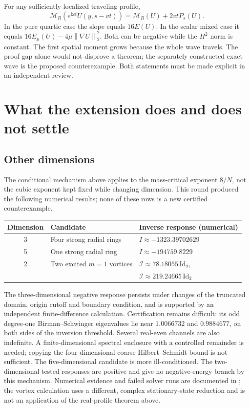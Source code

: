 \documentclass[11pt,a4paper]{article}
\theoremstyle{remark}\newtheorem{remark}[theorem]{Remark}
\newcommand{\ii}{\mathrm i}\newcommand{\dd}{\,\mathrm d}
\newcommand{\norm}[1]{\left\|#1\right\|}
\begin{document}
For any sufficiently localized traveling profile,
\begin{equation}\label{eq:drift}
 \mathcal M_R(e^{\ii\omega t}U(y,s-vt))
 =\mathcal M_R(U)+2vtP_s(U).
\end{equation}
In the pure quartic case the slope equals $16E(U)$. In the scalar mixed case it equals $16E_\mu(U)-4\mu\norm{\nabla U}_2^2$. Both can be negative while the $H^2$ norm is constant. The first spatial moment grows because the whole wave travels. The proof gap alone would not disprove a theorem; the separately constructed exact wave is the proposed counterexample. Both statements must be made explicit in an independent review.

\section{What the extension does and does not settle}
\subsection{Other dimensions}
The conditional mechanism above applies to the mass-critical exponent $8/N$, not the cubic exponent kept fixed while changing dimension. This round produced the following numerical results; none of these rows is a new certified counterexample.
\begin{center}
\begin{tabular}{@{}cll@{}}
\toprule
Dimension & Candidate & Inverse response (numerical)\\
\midrule
3 & Four strong radial rings & $I\approx-1323.39702629$\\
5 & One strong radial ring & $I\approx-194759.8229$\\
2 & Two excited $m=1$ vortices & $\mathcal I\approx78.18055\,\mathrm{Id}_2$,\\
  & & $\mathcal I\approx219.24665\,\mathrm{Id}_2$\\
\bottomrule
\end{tabular}
\end{center}
The three-dimensional negative response persists under changes of the truncated domain, origin cutoff and boundary condition, and is supported by an independent finite-difference calculation. Certification remains difficult: its odd degree-one Birman--Schwinger eigenvalues lie near $1.0066732$ and $0.9884677$, on both sides of the inversion threshold. Several real-even channels are also indefinite. A finite-dimensional spectral enclosure with a controlled remainder is needed; copying the four-dimensional coarse Hilbert--Schmidt bound is not sufficient. The five-dimensional candidate is more ill-conditioned. The two-dimensional tested responses are positive and give no negative-energy branch by this mechanism. Numerical evidence and failed solver runs are documented in ; the vortex calculation uses a different, complex stationary-state reduction and is not an application of the real-profile theorem above.
\end{document}
